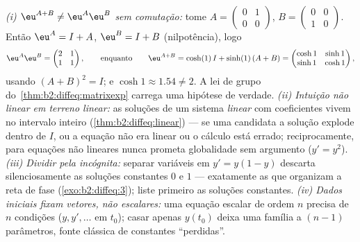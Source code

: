 \begin{remark}
\emph{(i) $\eu^{A+B} \neq \eu^A\eu^B$ sem comutação:}
tome $A = \begin{pmatrix} 0 & 1\\ 0 & 0\end{pmatrix}$, $B =
\begin{pmatrix} 0 & 0\\ 1 & 0\end{pmatrix}$. Então $\eu^A = I +
A$, $\eu^B = I + B$ (nilpotência), logo
\[
\eu^A\eu^B = \begin{pmatrix} 2 & 1\\ 1 & 1\end{pmatrix},
\qquad\text{enquanto}\qquad
\eu^{A+B} = \cosh(1)\,I + \sinh(1)\,(A + B)
= \begin{pmatrix} \cosh 1 & \sinh 1\\ \sinh 1 & \cosh 1
\end{pmatrix},
\]
usando $(A+B)^2 = I$; e $\cosh 1 \approx 1.54 \neq 2$. A
lei de grupo do~\cref{thm:b2:diffeq:matrixexp} carrega uma hipótese
de verdade. \emph{(ii) Intuição não linear em terreno linear:}
as soluções de um sistema \emph{linear} com coeficientes 
vivem no intervalo inteiro
(\cref{thm:b2:diffeq:linear}) --- se uma candidata a solução
explode dentro de $I$, ou a equação não era linear ou o
cálculo está errado; reciprocamente, para equações não lineares
nunca prometa globalidade sem argumento ($y' = y^2$).
\emph{(iii) Dividir pela incógnita:} separar variáveis em
$y' = y(1-y)$ descarta silenciosamente as soluções constantes $0$ e
$1$ --- exatamente as que organizam a reta de fase
(\cref{exo:b2:diffeq:3}); liste primeiro as soluções constantes.
\emph{(iv) Dados iniciais fixam vetores, não escalares:} uma equação
escalar de ordem $n$ precisa de $n$ condições ($y, y', \dots$ em
$t_0$); casar apenas $y(t_0)$ deixa uma família a
$(n-1)$ parâmetros, fonte clássica de constantes
``perdidas''.
\end{remark}

